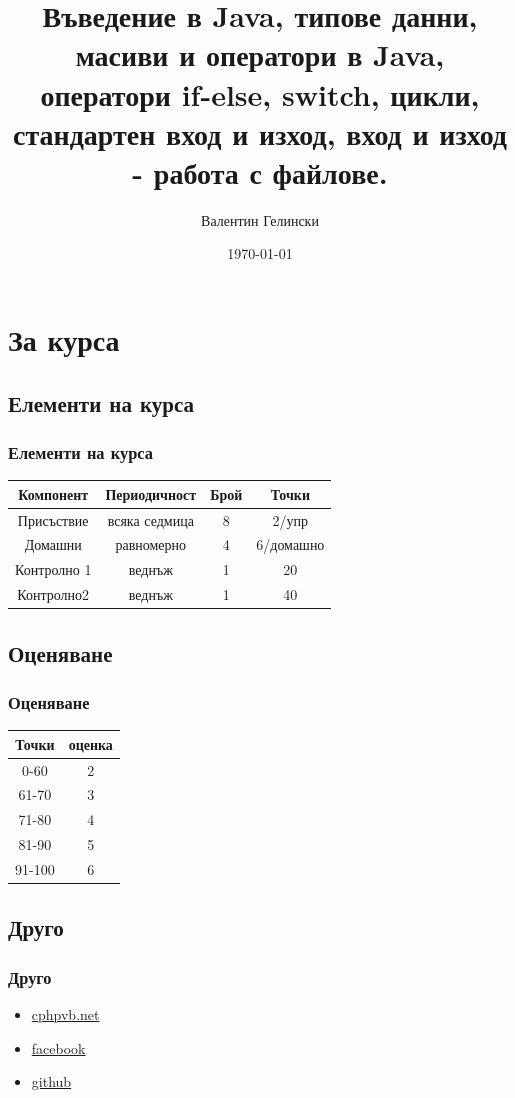 \documentclass{beamer}
\title{Въведение в Java, типове данни, масиви и оператори в Java, оператори if-else, switch, цикли, стандартен вход и изход, вход и изход - работа с файлове.}
\author{Валентин Гелински}
\institute{ТУ София}
\date{\today}
\begin{document}
  \begin{frame} 
    \titlepage
  \end{frame}

  \section{За курса} 
  \subsection{Елементи на курса}

  \begin{frame} 
    \frametitle{Елементи на курса}
     \begin{tabular}{|c|c|c|c|}
       \hline
       Компонент&Периодичност&Брой&Точки\\
       \hline
       Присъствие&всяка седмица&8&2/упр\\
       \hline
       Домашни&равномерно&4&6/домашно\\
       \hline
       Контролно 1&веднъж&1&20\\
       \hline
       Контролно2&веднъж&1&40\\
       \hline
     \end{tabular}
  \end{frame}

  \subsection{Оценяване}

  \begin{frame}
    \frametitle{Оценяване}
    \begin{tabular}{|c|c|}
      \hline
      Точки&оценка\\
      \hline
      0-60&2\\
      \hline
      61-70&3\\
      \hline
      71-80&4\\
      \hline
      81-90&5\\
      \hline
      91-100&6\\
      \hline
    \end{tabular}
  \end{frame}

  \subsection{Друго}

  \begin{frame}
    \frametitle{Друго}
    \begin{itemize}
      \item{\href{http://cphpvb.net/category/java/}{cphpvb.net}}
      \item{\href{https://www.facebook.com/groups/617381621641455/}{facebook}}
      \item{\href{https://github.com/vgelinski/tu_java_course}{github}}
    \end{itemize}
  \end{frame}
\end{document}
